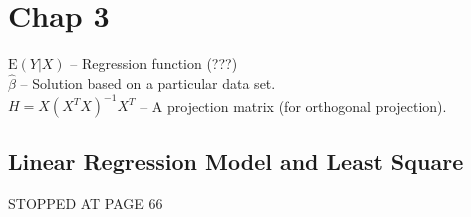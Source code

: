 \section*{Chap 3}
$\text{E}(Y|X)$ -- Regression function (???)\\
$\hat{\beta}$ -- Solution based on a particular data set.\\
$ H = X(X^TX)^{-1}X^T$ -- A projection matrix (for orthogonal projection).\\


\subsection*{Linear Regression Model and Least Square}
STOPPED AT PAGE 66
